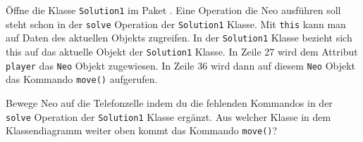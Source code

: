 



Öffne die Klasse \texttt{Solution1} im Paket \solutionPackage.
    Eine Operation die Neo ausführen soll steht schon in der \texttt{solve} Operation der \texttt{Solution1} Klasse.
    Mit \texttt{this} kann man auf Daten des aktuellen Objekts zugreifen.
    In der \texttt{Solution1} Klasse bezieht sich this auf das aktuelle Objekt der \texttt{Solution1} Klasse.
    In Zeile 27 wird dem Attribut \texttt{player} das \texttt{Neo} Objekt zugewiesen.
    In Zeile 36 wird dann auf diesem \texttt{Neo} Objekt das Kommando \texttt{move()} aufgerufen.


        \subexcercise Bewege Neo auf die Telefonzelle indem du die fehlenden Kommandos in der \texttt{solve} Operation der \texttt{Solution1} Klasse ergänzt.
        \subexcercise Aus welcher Klasse in dem Klassendiagramm weiter oben kommt das Kommando \texttt{move()}?

